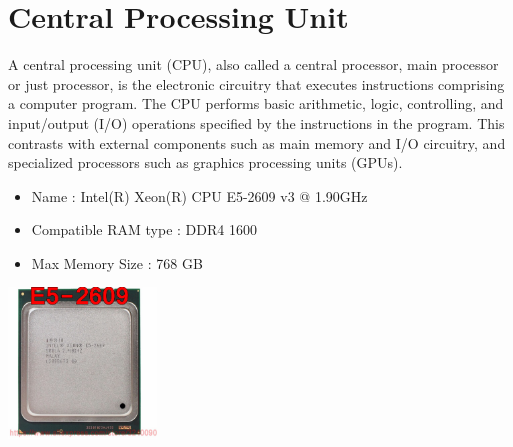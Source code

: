 \documentclass{article}
\begin{document}
\section{Central Processing Unit}
A central processing unit (CPU), also called a central processor, main processor or just processor, is the electronic circuitry that executes instructions comprising a computer program. The CPU performs basic arithmetic, logic, controlling, and input/output (I/O) operations specified by the instructions in the program. This contrasts with external components such as main memory and I/O circuitry, and specialized processors such as graphics processing units (GPUs).
\begin{itemize}
  \item Name                : Intel(R) Xeon(R) CPU E5-2609 v3 @ 1.90GHz
  \item Compatible RAM type        : DDR4 1600
  \item Max Memory Size            : 768 GB
\end{itemize}
\href{http://static6.arrow.com/aropdfconversion/bc27610082f0c9042063be09408c62b0895fa247/pgurl_5465333946064300.pdf}{\includegraphics[height=4cm]{CPU.jpg}}
\end{document}
